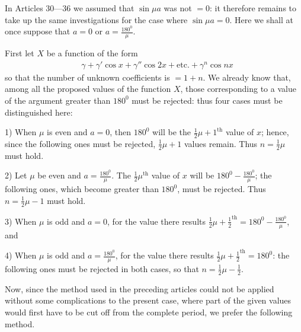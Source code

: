 \begingroup
\renewcommand{\arraystretch}{1.45}

In Articles 30---36 we assumed that $\sin\mu a$ was not $=0$: it therefore remains to take up the same investigations for the case where $\sin\mu a=0$. Here we shall at once suppose that $a=0$ or $a=\frac{180^{\mathord{0}}}{\mu}$.
\par First let $X$ be a function of the form
\[
\begin{aligned}
&\gamma+\gamma'\cos x+\gamma''\cos2x+\mathrm{etc.}+\gamma^n\cos nx
\end{aligned}
\]
so that the number of unknown coefficients is $=1+n$. We already know that, among all the proposed values of the function $X$, those corresponding to a value of the argument greater than $180^{\mathord{0}}$ must be rejected: thus four cases must be distinguished here:

1) When $\mu$ is even and $a=0$, then $180^{\mathord{0}}$ will be the $\frac12\mu+1^{\mathrm{th}}$ value of $x$; hence, since the following ones must be rejected, $\frac12\mu+1$ values remain. Thus $n=\frac12\mu$ must hold.

2) Let $\mu$ be even and $a=\frac{180^{\mathord{0}}}{\mu}$. The $\frac12\mu^{\mathrm{th}}$ value of $x$ will be $180^{\mathord{0}}-\frac{180^{\mathord{0}}}{\mu}$; the following ones, which become greater than $180^{\mathord{0}}$, must be rejected. Thus $n=\frac12\mu-1$ must hold.

3) When $\mu$ is odd and $a=0$, for the value there results $\frac12\mu+\frac12^{\mathrm{th}}=180^{\mathord{0}}-\frac{180^{\mathord{0}}}{\mu}$, and

4) When $\mu$ is odd and $a=\frac{180^{\mathord{0}}}{\mu}$, for the value there results $\frac12\mu+\frac12^{\mathrm{th}}=180^{\mathord{0}}$: the following ones must be rejected in both cases, so that $n=\frac12\mu-\frac12$.

Now, since the method used in the preceding articles could not be applied without some complications to the present case, where part of the given values would first have to be cut off from the complete period, we prefer the following method.

